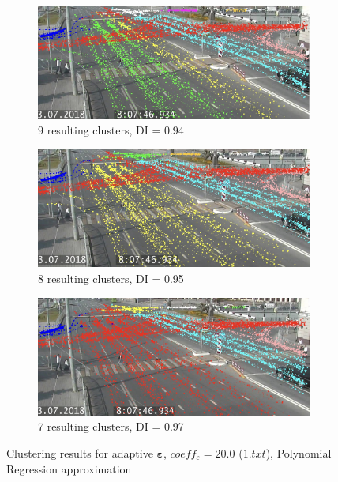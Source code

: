 \begin{figure}[!htb]
	\centering
	\begin{subfigure}[!htb]{0.495\textwidth}
		\centering{}
		\includegraphics[width=\textwidth]{images/9cl-di-1.jpeg}
		\caption{9 resulting clusters, DI = 0.94}
		\label{fig:9cl-di-1}
	\end{subfigure}
	\hfill
	\begin{subfigure}[!htb]{0.495\textwidth}
		\centering{}
		\includegraphics[width=\textwidth]{images/8cl-di-1.jpeg}
		\caption{8 resulting clusters, DI = 0.95}
		\label{fig:8cl-di-1}
	\end{subfigure}
	\hfill
	\begin{subfigure}[!htb]{0.495\textwidth}
		\centering{}
		\includegraphics[width=\textwidth]{images/7cl-di-1.jpeg}
		\caption{7 resulting clusters, DI = 0.97}
		\label{fig:7cl-di-1}
	\end{subfigure}
	\caption{Clustering results for adaptive $\bm{\varepsilon}$, $coeff_\varepsilon = 20.0$ ($1.txt$), Polynomial Regression approximation}
	\label{fig:clust-res-1}
\end{figure}

